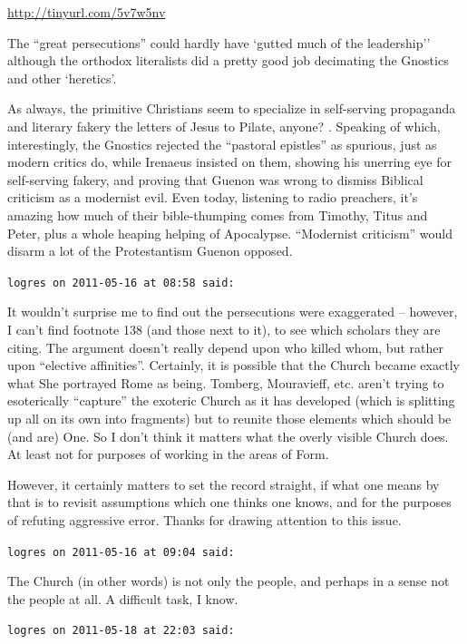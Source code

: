 \begin{footnotesize}
\begin{sffamily}
\url{http://tinyurl.com/5v7w5nv}


The ``great persecutions'' could hardly have `gutted much of the leadership'' although the orthodox literalists did a pretty good job decimating the Gnostics and other `heretics'.

As always, the primitive Christians seem to specialize in self-serving propaganda and literary fakery the letters of Jesus to Pilate, anyone? . Speaking of which, interestingly, the Gnostics rejected the ``pastoral epistles'' as spurious, just as modern critics do, while Irenaeus insisted on them, showing his unerring eye for self-serving fakery, and proving that Guenon was wrong to dismiss Biblical criticism as a modernist evil. Even today, listening to radio preachers, it's amazing how much of their bible-thumping comes from Timothy, Titus and Peter, plus a whole heaping helping of Apocalypse. ``Modernist criticism'' would disarm a lot of the Protestantism Guenon opposed.

\hfill

\texttt{logres on 2011-05-16 at 08:58 said:}

It wouldn't surprise me to find out the persecutions were exaggerated -- however, I can't find footnote 138 (and those next to it), to see which scholars they are citing. The argument doesn't really depend upon who killed whom, but rather upon ``elective affinities''. Certainly, it is possible that the Church became exactly what She portrayed Rome as being. Tomberg, Mouravieff, etc. aren't trying to esoterically ``capture'' the exoteric Church as it has developed (which is splitting up all on its own into fragments) but to reunite those elements which should be (and are) One. So I don't think it matters what the overly visible Church does. At least not for purposes of working in the areas of Form.

However, it certainly matters to set the record straight, if what one means by that is to revisit assumptions which one thinks one knows, and for the purposes of refuting aggressive error. Thanks for drawing attention to this issue.

\hfill

\texttt{logres on 2011-05-16 at 09:04 said:}

The Church (in other words) is not only the people, and perhaps in a sense not the people at all. A difficult task, I know.

\hfill

\texttt{logres on 2011-05-18 at 22:03 said:}


\end{sffamily}
\end{footnotesize}
